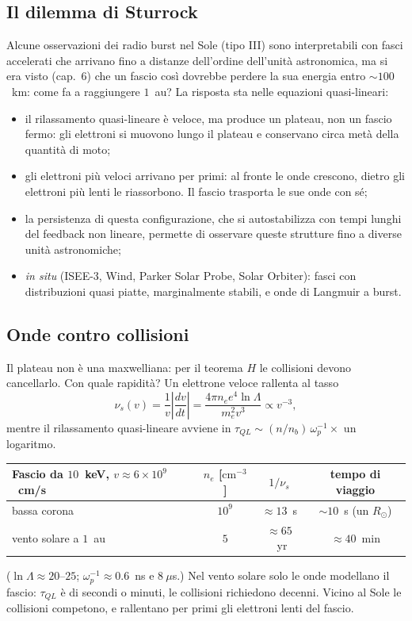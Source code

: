 \subsection{Il dilemma di Sturrock}
Alcune osservazioni dei radio burst nel Sole (tipo III) sono interpretabili con fasci accelerati che arrivano fino a distanze dell'ordine dell'unità astronomica, ma si era visto (cap.~6) che un fascio così dovrebbe perdere la sua energia entro $\sim100$~km: come fa a raggiungere $1$~au? La risposta sta nelle equazioni quasi-lineari:
\begin{itemize}
\item il rilassamento quasi-lineare è veloce, ma produce un plateau, non un fascio fermo: gli elettroni si muovono lungo il plateau e conservano circa metà della quantità di moto;
\item gli elettroni più veloci arrivano per primi: al fronte le onde crescono, dietro gli elettroni più lenti le riassorbono. Il fascio trasporta le sue onde con sé;
\item la persistenza di questa configurazione, che si autostabilizza con tempi lunghi del feedback non lineare, permette di osservare queste strutture fino a diverse unità astronomiche;
\item \textit{in situ} (ISEE-3, Wind, Parker Solar Probe, Solar Orbiter): fasci con distribuzioni quasi piatte, marginalmente stabili, e onde di Langmuir a burst.
\end{itemize}

\subsection{Onde contro collisioni}
Il plateau non è una maxwelliana: per il teorema $H$ le collisioni devono cancellarlo. Con quale rapidità? Un elettrone veloce rallenta al tasso
\begin{equation}
\nu_s(v)=\frac1v\left|\frac{dv}{dt}\right|=\frac{4\pi n_ee^4\ln\Lambda}{m_e^2v^3}\propto v^{-3},
\end{equation}
mentre il rilassamento quasi-lineare avviene in $\tau_{QL}\sim(n/n_b)\,\omega_p^{-1}\times$ un logaritmo.
\begin{center}
\small
\begin{tabular}{|l|c|c|c|}
\hline
Fascio da $10$~keV, $v\approx6\times10^9$~cm/s & $n_e$ [$\mathrm{cm^{-3}}$] & $1/\nu_s$ & tempo di viaggio\\
\hline
bassa corona & $10^9$ & $\approx13$~s & $\sim10$~s (un $R_\odot$)\\
\hline
vento solare a $1$~au & $5$ & $\approx65$~yr & $\approx40$~min\\
\hline
\end{tabular}
\end{center}
($\ln\Lambda\approx20$--$25$; $\omega_p^{-1}\approx0.6$~ns e $8~\mu$s.) Nel vento solare solo le onde modellano il fascio: $\tau_{QL}$ è di secondi o minuti, le collisioni richiedono decenni. Vicino al Sole le collisioni competono, e rallentano per primi gli elettroni lenti del fascio.

